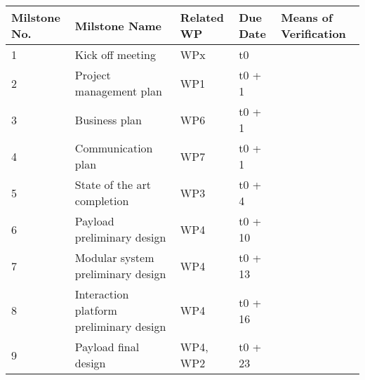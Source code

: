 \begin{longtable}[H]{p{1.9cm} p{3cm} p{2.2cm} p{2cm} l }
	\toprule[2pt]
	
	\textbf{Milstone No.} & \textbf{Milstone Name} & \textbf{Related WP} & \textbf{Due Date} & \textbf{Means of Verification} \\
	
	\midrule[1.5pt] 
	\endhead
	
	1 & Kick off meeting & WPx & t0 & \vspace{0.2cm} \\
	
	\midrule

	2 & Project management plan & WP1 & t0 + 1 & \vspace{0.2cm} \\
	
	\midrule
	
	3 & Business plan & WP6 & t0 + 1 & \vspace{0.2cm} \\

	\midrule

 	4 & Communication plan & WP7 & t0 + 1 & \vspace{0.2cm} \\
 	 
 	\midrule
 	 
 	5 & State of the art completion & WP3 & t0 + 4 & \vspace{0.2cm} \\
 	
 	\midrule
 
 	6 & Payload preliminary design & WP4 & t0 + 10 & \vspace{0.2cm} \\
 
 	\midrule
 
  	7 & Modular system preliminary design & WP4 & t0 + 13 & \vspace{0.2cm} \\
 
 	\midrule
 
 	8 & Interaction platform preliminary design & WP4 & t0 + 16 & \vspace{0.2cm} \\
 
 	\midrule
 
 	9 & Payload final design & WP4, WP2 & t0 + 23 & \vspace{0.2cm} \\
 
 	\midrule
 

\end{longtable}
